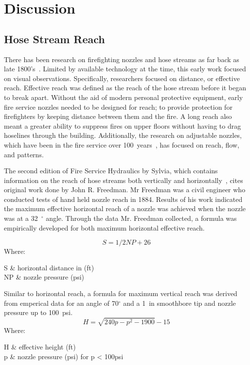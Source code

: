 \documentclass[12pt,oneside]{book}
\begin{document}
\chapter{Discussion}

\section{Hose Stream Reach}
\label{sec:hose_reach}
There has been research on firefighting nozzles and hose streams as far back as late 1800's~\cite{CHICAGO_TRIBUNE:1339:a}. Limited by available technology at the time, this early work focused on visual observations. Specifically, researchers focused on distance, or effective reach. Effective reach was defined as the reach of the hose stream before it began to break apart. Without the aid of modern personal protective equipment, early fire service nozzles needed to be designed for reach; to provide protection for firefighters by keeping distance between them and the fire. A long reach also meant a greater ability to suppress fires on upper floors without having to drag hoselines through the building. Additionally, the research on adjustable nozzles, which have been in the fire service over 100~years~\cite{PALMER:1878}, has focused on reach, flow, and patterns. 

The second edition of Fire Service Hydraulics by Sylvia, which contains information on the reach of hose streams both vertically and horizontally~\cite{SYLVIA:1970}, cites original work done by John R. Freedman. Mr Freedman was a civil engineer who conducted tests of hand held nozzle reach in 1884. Results of his work indicated the maximum effective horizontal reach of a nozzle was achieved when the nozzle was at a 32~$^\circ$ angle. Through the data Mr. Freedman collected, a formula was empirically developed for both maximum horizontal effective reach. 

\begin{equation*}
	S = 1/2NP+26
\end{equation*}
Where:
\begin{conditions}
	S & horizontal distance in (ft) \\
	NP & nozzle pressure (psi) \\
\end{conditions}

Similar to horizontal reach, a formula for maximum vertical reach was derived from emperical data for an angle of 70$^{\circ}$ and a 1~in smoothbore tip and nozzle pressure up to 100~psi.
\begin{equation*}
	H = \sqrt{240p - p^2 - 1900} -15
\end{equation*}
Where:
\begin{conditions}
	H & effective height (ft) \\
	p & nozzle pressure (psi) for p < 100psi \\
\end{conditions}
\end{document}
